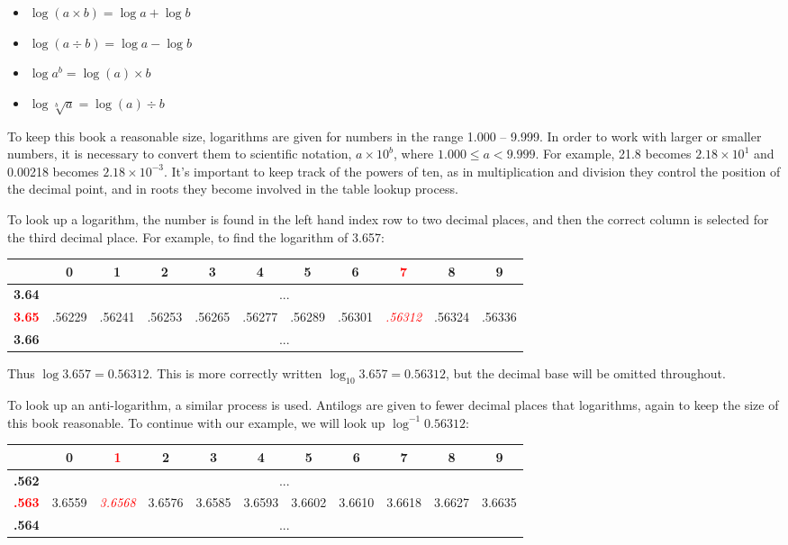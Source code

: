 \documentclass[twoside,a4paper]{article}
\begin{document}
\begin{itemize}
\item $\log{(a \times b)} = \log{a} + \log{b}$
\item $\log{(a \div b)} = \log{a} - \log{b}$
\item $\log{a^b} = \log{(a)} \times b$
\item $\log{\sqrt[b]{a}} = \log{(a)} \div b$ 
\end{itemize}

To keep this book a reasonable size, logarithms are given for numbers in the range 1.000 -- 9.999. In order to work with larger or smaller numbers, it is necessary to convert them to scientific notation, $a \times 10^b$, where $1.000 \leq a < 9.999$. For example, 21.8 becomes  $2.18 \times 10^1$ and 0.00218 becomes $2.18 \times 10^{-3}$. It's important to keep track of the powers of ten, as in multiplication and division they control the position of the decimal point, and in roots they become involved in the table lookup process.

To look up a logarithm, the number is found in the left hand index row to two decimal places, and then the correct column is selected for the third decimal place. For example, to find the logarithm of 3.657:

\begin{longtable}[c]{|*{11}{c|}}
 & \textbf{0} & \textbf{1} & \textbf{2} & \textbf{3} & \textbf{4} & \textbf{5} & \textbf{6} & \textcolor{red}{\textbf{7}} & \textbf{8} & \textbf{9} \\
\hline \endhead
\hline \endfoot
 \textbf{3.64} & \multicolumn{10}{c|}{...} \\
\rowcolor{bg} \textcolor{red}{\textbf{3.65}} & .56229 & .56241 & .56253 & .56265 & .56277 & .56289 & .56301 & \textcolor{red}{\textit{.56312}} & .56324 & .56336 \\
 \textbf{3.66} & \multicolumn{10}{c|}{...} \\
\end{longtable}

Thus $\log{3.657} = 0.56312$. This is more correctly written $\log_{10}{3.657} = 0.56312$, but the decimal base will be omitted throughout.

To look up an anti-logarithm, a similar process is used. Antilogs are given to fewer decimal places that logarithms, again to keep the size of this book reasonable. To continue with our example, we will look up  $\log^{-1}{0.56312}$:


\begin{longtable}[c]{|*{11}{c|}}
 & \textbf{0} & \textcolor{red}{\textbf{1}} & \textbf{2} & \textbf{3} & \textbf{4} & \textbf{5} & \textbf{6} & \textbf{7} & \textbf{8} & \textbf{9} \\
\hline \endhead
\hline \endfoot
 \textbf{.562} & \multicolumn{10}{c|}{...} \\
\rowcolor{bg} \textcolor{red}{\textbf{.563}} & 3.6559 & \textcolor{red}{\textit{3.6568}} & 3.6576 & 3.6585 & 3.6593 & 3.6602 & 3.6610 & 3.6618 & 3.6627 & 3.6635 \\
 \textbf{.564} & \multicolumn{10}{c|}{...} \\
\end{longtable}
\end{document}
